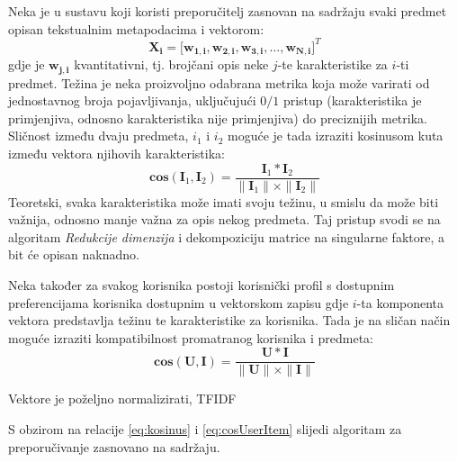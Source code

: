 \documentclass[times, utf8, diplomski, numeric]{fer}
\begin{document}
Neka je u sustavu koji koristi preporučitelj zasnovan na sadržaju svaki predmet
opisan tekstualnim metapodacima i vektorom:
\begin{equation}
\label{eq:vektorKarakteristika}
	\boldsymbol{X_i} = 
		\big[ 
			\boldsymbol{w_{1,i}}, 
			\boldsymbol{w_{2,i}}, 
			\boldsymbol{w_{3,i}}, 
			\ldots, 
			\boldsymbol{w_{N,i}} 
		\big]^T
\end{equation}
gdje je $\boldsymbol{w_{j,i}}$ kvantitativni, tj. brojčani opis neke $j$-te
karakteristike za $i$-ti predmet. Težina je neka proizvoljno odabrana metrika
koja može varirati od jednostavnog broja pojavljivanja, uključujući $0/1$
pristup (karakteristika je primjenjiva, odnosno karakteristika nije
primjenjiva) do preciznijih metrika. Sličnost između dvaju predmeta, $i_1$ i
$i_2$ moguće je tada izraziti kosinusom kuta između vektora njihovih
karakteristika:
\begin{equation}
\label{eq:kosinus}
	\boldsymbol{cos}(\boldsymbol{I}_1, \boldsymbol{I}_2) = 
		\frac
			{\boldsymbol{I}_1 \ast \boldsymbol{I}_2}
			{\|\boldsymbol{I}_1\| \times \|\boldsymbol{I}_2\|}
\end{equation}
Teoretski, svaka karakteristika može imati svoju težinu, u smislu da može biti
važnija, odnosno manje važna za opis nekog predmeta. Taj pristup svodi se na
algoritam \emph{Redukcije dimenzija} i dekompoziciju matrice na singularne
faktore, a bit će opisan naknadno.

Neka također za svakog korisnika postoji korisnički profil s dostupnim
preferencijama korisnika dostupnim u vektorskom zapisu gdje $i$-ta komponenta
vektora predstavlja težinu te karakteristike za korisnika. Tada je na sličan
način moguće izraziti kompatibilnost promatranog korisnika i predmeta:
\begin{equation}
\label{eq:cosUserItem}
	\boldsymbol{cos}(\boldsymbol{U}, \boldsymbol{I}) = 
		\frac
			{\boldsymbol{U} \ast \boldsymbol{I}}
			{\|\boldsymbol{U}\| \times \|\boldsymbol{I}\|}
\end{equation}


Vektore je poželjno normalizirati, TFIDF

S obzirom na relacije \ref{eq:kosinus} i \ref{eq:cosUserItem} slijedi algoritam
za preporučivanje zasnovano na sadržaju.
\end{document}
